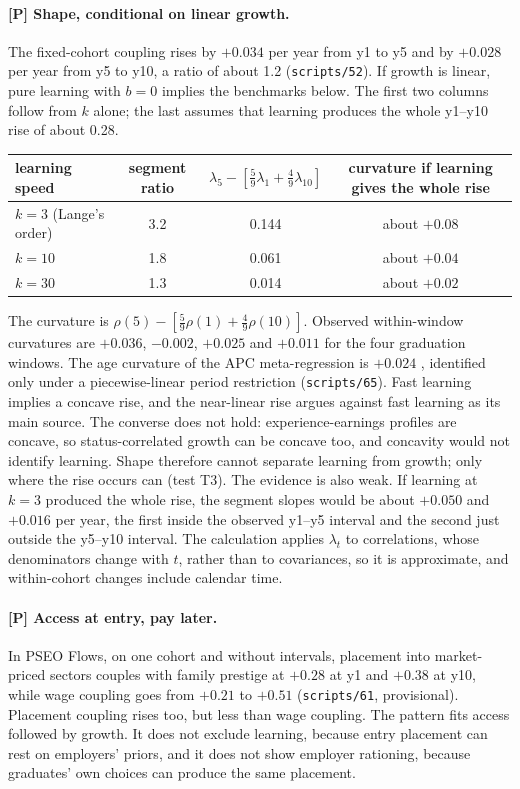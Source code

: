 \paragraph{[P] Shape, conditional on linear growth.} The fixed-cohort coupling rises by $+0.034$
 per year from y1 to y5 and by $+0.028$  per year from y5 to y10, a ratio of
about 1.2 (\texttt{scripts/52}). If growth is linear, pure learning with $b=0$ implies the benchmarks below. The
first two columns follow from $k$ alone; the last assumes that learning produces the whole y1--y10 rise of about
0.28.

\medskip
\begin{center}
\small
\begin{tabular}{@{}lccc@{}}
\toprule
learning speed & segment ratio & $\lambda_5-[\tfrac59\lambda_1+\tfrac49\lambda_{10}]$ &
curvature if learning gives the whole rise\\
\midrule
$k=3$ (Lange's order) & 3.2 & 0.144 & about $+0.08$\\
$k=10$ & 1.8 & 0.061 & about $+0.04$\\
$k=30$ & 1.3 & 0.014 & about $+0.02$\\
\bottomrule
\end{tabular}
\end{center}
\medskip

\noindent The curvature is $\rho(5)-[\tfrac59\rho(1)+\tfrac49\rho(10)]$. Observed within-window curvatures are
$+0.036$, $-0.002$, $+0.025$ and $+0.011$ for the four graduation windows. The age curvature of the APC
meta-regression is $+0.024$ , identified only under a piecewise-linear period restriction
(\texttt{scripts/65}). Fast learning implies a concave rise, and the near-linear rise argues against fast learning
as its main source. The converse does not hold: experience-earnings profiles are concave, so status-correlated
growth can be concave too, and concavity would not identify learning. Shape therefore cannot separate learning from
growth; only where the rise occurs can (test T3). The evidence is also weak. If learning at $k=3$ produced the whole
rise, the segment slopes would be about $+0.050$ and $+0.016$ per year, the first inside the observed y1--y5
interval and the second just outside the y5--y10 interval. The calculation applies $\lambda_t$ to correlations,
whose denominators change with $t$, rather than to covariances, so it is approximate, and within-cohort changes
include calendar time.

\paragraph{[P] Access at entry, pay later.} In PSEO Flows, on one cohort and without intervals, placement into
market-priced sectors couples with family prestige at $+0.28$ at y1 and $+0.38$ at y10, while wage coupling goes
from $+0.21$ to $+0.51$ (\texttt{scripts/61}, provisional). Placement coupling rises too, but less than wage
coupling. The pattern fits access followed by growth. It does not exclude learning, because entry placement can
rest on employers' priors, and it does not show employer rationing, because graduates' own choices can produce the
same placement.

